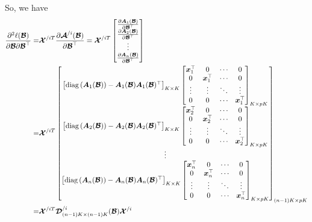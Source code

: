 \documentclass[11pt]{article}
\begin{document}
So, we have
$$\begin{aligned}
\frac{\partial^2\ell(\bm{\mathcal{B}})}{\partial\bm{\mathcal{B}}\partial\bm{\mathcal{B}}^\top}=&\bm{\mathcal{X}}^{/iT}\frac{\partial \bm{\mathcal{A}}^{/i}(\bm{\mathcal{B}})}{\partial\bm{\mathcal{B}}^\top}=
\bm{\mathcal{X}}^{/iT}\begin{bmatrix}
\frac{\partial \bm{A}_1(\bm{\mathcal{B}})}{\partial\bm{\mathcal{B}}^\top} \\
\frac{\partial \bm{A}_2(\bm{\mathcal{B}})}{\partial\bm{\mathcal{B}}^\top} \\
\vdots \\
\frac{\partial \bm{A}_n(\bm{\mathcal{B}})}{\partial\bm{\mathcal{B}}^\top} \\
\end{bmatrix} \\
=&\bm{\mathcal{X}}^{/iT}
\begin{bmatrix}
\left[{\rm diag}\left(\bm{A}_1(\bm{\mathcal{B}})\right)-\bm{A}_1(\bm{\mathcal{B}})\bm{A}_1(\bm{\mathcal{B}})^\top\right]_{K\times K}
\begin{bmatrix}
\bm{x}_1^\top & 0 & \cdots & 0 \\
0 & \bm{x}_1^\top & \cdots & 0 \\
\vdots & \vdots & \ddots & \vdots \\
0 & 0 & \cdots & \bm{x}_1^\top \\
\end{bmatrix}_{K\times pK} \\
\left[{\rm diag}\left(\bm{A}_2(\bm{\mathcal{B}})\right)-\bm{A}_2(\bm{\mathcal{B}})\bm{A}_2(\bm{\mathcal{B}})^\top\right]_{K\times K}
\begin{bmatrix}
\bm{x}_2^\top & 0 & \cdots & 0 \\
0 & \bm{x}_2^\top & \cdots & 0 \\
\vdots & \vdots & \ddots & \vdots \\
0 & 0 & \cdots & \bm{x}_2^\top \\
\end{bmatrix}_{K\times pK} \\
\vdots \\
\left[{\rm diag}\left(\bm{A}_n(\bm{\mathcal{B}})\right)-\bm{A}_n(\bm{\mathcal{B}})\bm{A}_n(\bm{\mathcal{B}})^\top\right]_{K\times K}
\begin{bmatrix}
\bm{x}_n^\top & 0 & \cdots & 0 \\
0 & \bm{x}_n^\top & \cdots & 0 \\
\vdots & \vdots & \ddots & \vdots \\
0 & 0 & \cdots & \bm{x}_n^\top \\
\end{bmatrix}_{K\times pK} \\
\end{bmatrix}_{(n-1)K\times pK} \\
=&\bm{\mathcal{X}}^{/iT}
\bm{\mathcal{D}}_{(n-1)K\times (n-1)K}^{/i}(\bm{\mathcal{B}})\bm{\mathcal{X}}^{/i} \\
\end{aligned}$$
\end{document}

